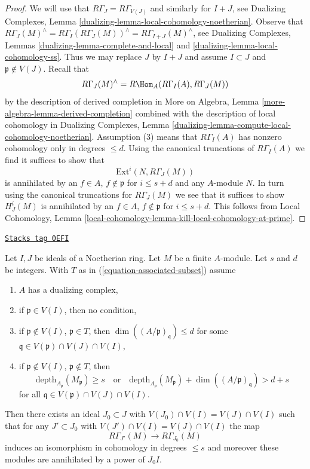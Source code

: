 \begin{proof}
We will use that $R\Gamma_J = R\Gamma_{V(J)}$ and similarly for
$I + J$, see
Dualizing Complexes, Lemma \ref{dualizing-lemma-local-cohomology-noetherian}.
Observe that
$R\Gamma_J(M)^\wedge = R\Gamma_I(R\Gamma_J(M))^\wedge =
R\Gamma_{I + J}(M)^\wedge$, see
Dualizing Complexes, Lemmas
\ref{dualizing-lemma-complete-and-local} and
\ref{dualizing-lemma-local-cohomology-ss}.
Thus we may replace $J$ by $I + J$ and assume $I \subset J$
and $\mathfrak p \not \in V(J)$.
Recall that
$$
R\Gamma_J(M)^\wedge = R\Hom_A(R\Gamma_I(A), R\Gamma_J(M))
$$
by the description of derived completion in
More on Algebra, Lemma \ref{more-algebra-lemma-derived-completion}
combined with the description of local cohomology in
Dualizing Complexes, Lemma
\ref{dualizing-lemma-compute-local-cohomology-noetherian}.
Assumption (3) means that $R\Gamma_I(A)$ has nonzero cohomology
only in degrees $\leq d$. Using the canonical truncations of
$R\Gamma_I(A)$ we find it suffices to show that
$$
\text{Ext}^i(N, R\Gamma_J(M))
$$
is annihilated by an $f \in A$, $f \not \in \mathfrak p$ for
$i \leq s + d$ and any $A$-module $N$.
In turn using the canonical truncations for $R\Gamma_J(M)$
we see that it suffices to show
$H^i_J(M)$ is annihilated by an $f \in A$, $f \not \in \mathfrak p$
for $i \leq s + d$.
This follows from Local Cohomology, Lemma
\ref{local-cohomology-lemma-kill-local-cohomology-at-prime}.
\end{proof}

\begin{lemma}
\label{algebraization-lemma-kill-colimit-weak-general}
\href{https://stacks.math.columbia.edu/tag/0EFI}{\texttt{Stacks tag 0EFI}}

Let $I, J$ be ideals of a Noetherian ring. Let $M$ be a finite $A$-module.
Let $s$ and $d$ be integers. With $T$ as in
(\ref{equation-associated-subset}) assume
\begin{enumerate}
\item $A$ has a dualizing complex,
\item if $\mathfrak p \in V(I)$, then no condition,
\item if $\mathfrak p \not \in V(I)$, $\mathfrak p \in T$, then
$\dim((A/\mathfrak p)_\mathfrak q) \leq d$ for some
$\mathfrak q \in V(\mathfrak p) \cap V(J) \cap V(I)$,
\item if $\mathfrak p \not \in V(I)$, $\mathfrak p \not \in T$, then
$$
\text{depth}_{A_\mathfrak p}(M_\mathfrak p) \geq s
\quad\text{or}\quad
\text{depth}_{A_\mathfrak p}(M_\mathfrak p) +
\dim((A/\mathfrak p)_\mathfrak q) > d + s
$$
for all $\mathfrak q \in V(\mathfrak p) \cap V(J) \cap V(I)$.
\end{enumerate}
Then there exists an ideal $J_0 \subset J$ with
$V(J_0) \cap V(I) = V(J) \cap V(I)$ such that for any $J' \subset J_0$ with
$V(J') \cap V(I) = V(J) \cap V(I)$ the map
$$
R\Gamma_{J'}(M) \longrightarrow R\Gamma_{J_0}(M)
$$
induces an isomorphism in cohomology in degrees $\leq s$
and moreover these modules are annihilated by a power of $J_0I$.
\end{lemma}

